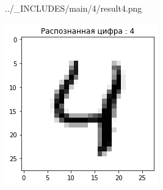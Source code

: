 \begin{figure}[!htp]
\begin{minipage}[h]{0.19\linewidth}
        {../_INCLUDES/main/4/result4.png}
    \end{minipage}
    \hfill
    \begin{minipage}[h]{0.19\linewidth}
        \centering
        \includegraphics[width=\linewidth]
        {../_INCLUDES/main/4/result5.png}
    \end{minipage}



\end{figure}

